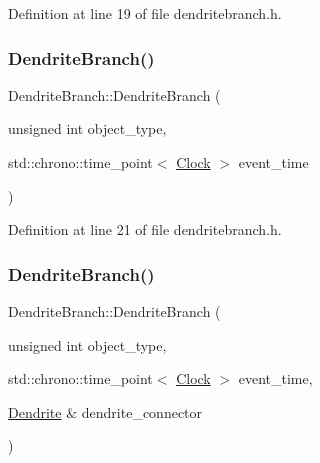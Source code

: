 Definition at line 19 of file dendritebranch.\+h.

\mbox{\label{class_dendrite_branch_a390bfee680074f5f3ddcd9aee54db679}} 
\subsubsection{\texorpdfstring{Dendrite\+Branch()}{DendriteBranch()}\hspace{0.1cm}{\footnotesize\ttfamily [3/4]}}
{\footnotesize\ttfamily Dendrite\+Branch\+::\+Dendrite\+Branch (\begin{DoxyParamCaption}\item[{unsigned int}]{object\+\_\+type,  }\item[{std\+::chrono\+::time\+\_\+point$<$ \hyperlink{universe_8h_a0ef8d951d1ca5ab3cfaf7ab4c7a6fd80}{Clock} $>$}]{event\+\_\+time }\end{DoxyParamCaption})\hspace{0.3cm}{\ttfamily [inline]}}



Definition at line 21 of file dendritebranch.\+h.

\mbox{\label{class_dendrite_branch_a9b7e932b0614dad370edd76f31900c40}} 
\subsubsection{\texorpdfstring{Dendrite\+Branch()}{DendriteBranch()}\hspace{0.1cm}{\footnotesize\ttfamily [4/4]}}
{\footnotesize\ttfamily Dendrite\+Branch\+::\+Dendrite\+Branch (\begin{DoxyParamCaption}\item[{unsigned int}]{object\+\_\+type,  }\item[{std\+::chrono\+::time\+\_\+point$<$ \hyperlink{universe_8h_a0ef8d951d1ca5ab3cfaf7ab4c7a6fd80}{Clock} $>$}]{event\+\_\+time,  }\item[{\hyperlink{class_dendrite}{Dendrite} \&}]{dendrite\+\_\+connector }\end{DoxyParamCaption})\hspace{0.3cm}{\ttfamily [inline]}}




